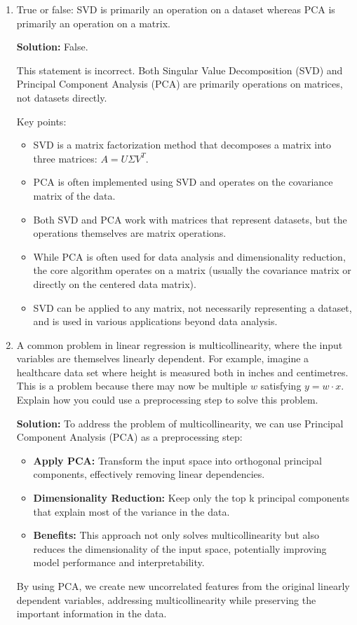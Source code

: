 \documentclass{article}
\begin{document}
\begin{enumerate}
    \item True or false: SVD is primarily an operation on a dataset whereas PCA is primarily an operation on a matrix.

    \textbf{Solution:} False.

    This statement is incorrect. Both Singular Value Decomposition (SVD) and Principal Component Analysis (PCA) are primarily operations on matrices, not datasets directly.

    Key points:
    \begin{itemize}
        \item SVD is a matrix factorization method that decomposes a matrix into three matrices: $A = U\Sigma V^T$.
        \item PCA is often implemented using SVD and operates on the covariance matrix of the data.
        \item Both SVD and PCA work with matrices that represent datasets, but the operations themselves are matrix operations.
        \item While PCA is often used for data analysis and dimensionality reduction, the core algorithm operates on a matrix (usually the covariance matrix or directly on the centered data matrix).
        \item SVD can be applied to any matrix, not necessarily representing a dataset, and is used in various applications beyond data analysis.
    \end{itemize}

    \item A common problem in linear regression is multicollinearity, where the input variables are themselves linearly dependent. For example, imagine a healthcare data set where height is measured both in inches and centimetres. This is a problem because there may now be multiple $w$ satisfying $y = w \cdot x$. Explain how you could use a preprocessing step to solve this problem.

    \textbf{Solution:} 
    To address the problem of multicollinearity, we can use Principal Component Analysis (PCA) as a preprocessing step:

    \begin{itemize}
        \item \textbf{Apply PCA:} Transform the input space into orthogonal 
              principal components, effectively removing linear dependencies.
        
        \item \textbf{Dimensionality Reduction:} Keep only the top k principal 
              components that explain most of the variance in the data.
        
        \item \textbf{Benefits:} This approach not only solves multicollinearity 
              but also reduces the dimensionality of the input space, potentially 
              improving model performance and interpretability.
    \end{itemize}

    By using PCA, we create new uncorrelated features from the original 
    linearly dependent variables, addressing multicollinearity while 
    preserving the important information in the data.
\end{enumerate}
\end{document}
